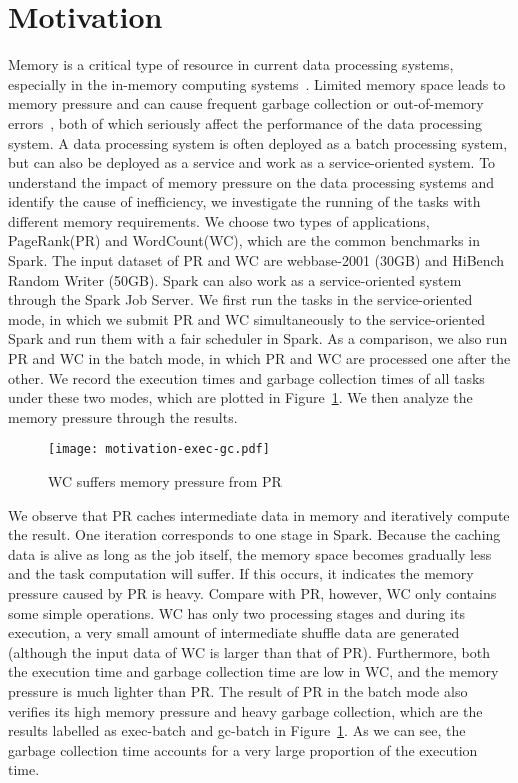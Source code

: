 \section{Motivation}
\label{sec:motivation}

Memory is a critical type of resource in current data processing systems, especially in the in-memory computing systems~\cite{shi:mammoth}. Limited memory space leads to memory pressure and can cause frequent garbage collection or out-of-memory errors~\cite{fang2015interruptible}, both of which seriously affect the performance of the data processing system. A data processing system is often deployed as a batch processing system, but can also be deployed as a service and work as a service-oriented system. To understand the impact of memory pressure on the data processing systems and identify the cause of inefficiency, we investigate the running of the tasks with different memory requirements. We choose two types of applications, PageRank(PR) and WordCount(WC), which are the common benchmarks in Spark. The input dataset of PR and WC are webbase-2001 (30GB) and HiBench Random Writer (50GB). Spark can also work as a service-oriented system through the Spark Job Server. We first run the tasks in the service-oriented mode, in which we submit PR and WC simultaneously to the service-oriented Spark and run them with a fair scheduler in Spark. As a comparison, we also run PR and WC in the batch mode, in which PR and WC are processed one after the other. We record the execution times and garbage collection times of all tasks under these two modes, which are plotted in Figure~\ref{fig:memorypressure}. We then analyze the  memory pressure through the results.   

\begin{figure}[!t]
\centering
\texttt{[image: motivation-exec-gc.pdf]}
\vspace{-2mm}
\caption{WC suffers memory pressure from PR}
\vspace{-6mm}
\label{fig:memorypressure}
\end{figure}

We observe that PR caches intermediate data in memory and iteratively compute the result. One iteration corresponds to one stage in Spark. Because the caching data is alive as long as the job itself, the memory space becomes gradually less and the task computation will suffer. If this occurs, it indicates the memory pressure caused by PR is heavy. Compare with PR, however, WC only contains some simple operations. WC has only two processing stages and during its execution, a very small amount of intermediate shuffle data are generated (although the input data of WC is larger than that of PR). Furthermore, both the execution time and garbage collection time are low in WC, and the memory pressure is much lighter than PR. The result of PR in the batch mode also verifies its high memory pressure and heavy garbage collection, which are the results labelled as exec-batch and gc-batch in Figure~\ref{fig:memorypressure}. As we can see, the garbage collection time accounts for a very large proportion of the execution time.

